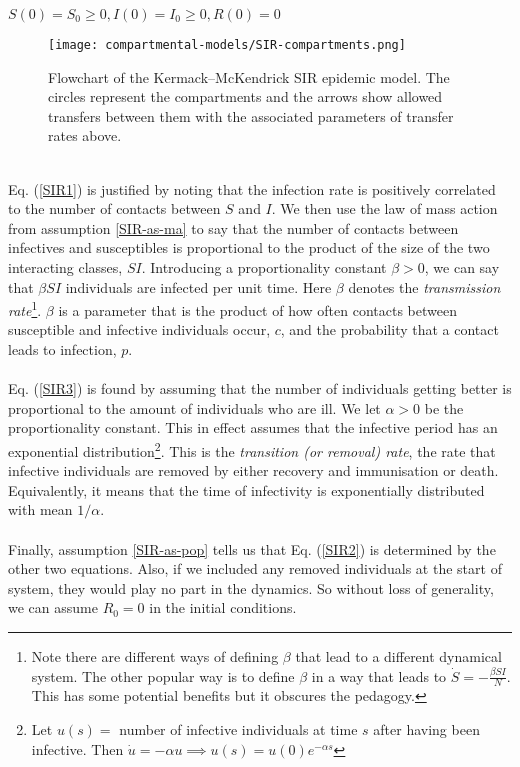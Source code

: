$S(0)=S_0\geq0, I(0)=I_0\geq0, R(0)=0$\\
\begin{figure}
	\centering
	\texttt{[image: compartmental-models/SIR-compartments.png]}
	\caption{Flowchart of the Kermack–McKendrick SIR epidemic model. The circles represent the compartments and the arrows show allowed transfers between them with the associated parameters of transfer rates above.}
\end{figure}
\\
Eq. (\ref{SIR1}) is justified by noting that the infection rate is positively correlated to the number of contacts between $S$ and $I$. We then use the law of mass action from assumption \ref{SIR-as-ma} to say that the number of contacts between infectives and susceptibles is proportional to the product of the size of the two interacting classes, $SI$. Introducing a proportionality constant $\beta>0$, we can say that $\beta SI$ individuals are infected per unit time. Here $\beta$ denotes the \textit{transmission rate}\footnote{Note there are different ways of defining $\beta$ that lead to a different dynamical system. The other popular way is to define $\beta$ in a way that leads to $\dot S=-\frac{\beta S I}{N}$. This has some potential benefits but it obscures the pedagogy.}. $\beta$ is a parameter that is the product of how often contacts between susceptible and infective individuals occur, $c$, and the probability that a contact leads to infection, $p$.\\
\\
Eq. (\ref{SIR3}) is found by assuming that the number of individuals getting better is proportional to the amount of individuals who are ill. We let $\alpha>0$ be the proportionality constant. This in effect assumes that the infective period has an exponential distribution\footnote{Let $u(s)=$ number of infective individuals at time $s$ after having been infective. Then $\dot u=-\alpha u\implies u(s)=u(0)e^{-\alpha s}$}.  This is the \textit{transition (or removal) rate}, the rate that infective individuals are removed by either recovery and immunisation or death. Equivalently, it  means that the time of infectivity is exponentially distributed with mean $1/\alpha$.\\
\\
Finally, assumption \ref{SIR-as-pop} tells us that Eq. (\ref{SIR2}) is determined by the other two equations. Also, if we included any removed individuals at the start of system, they would play no part in the dynamics. So without loss of generality, we can assume $R_0=0$ in the initial conditions.
